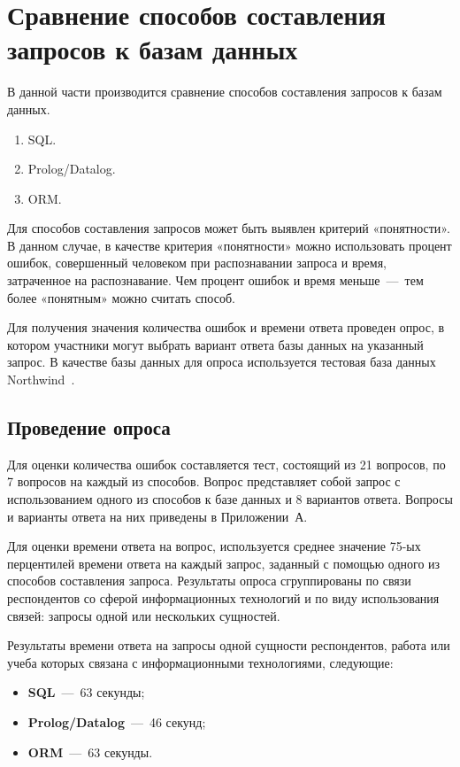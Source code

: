 \chapter{Сравнение способов составления запросов к базам данных}

В данной части производится сравнение способов составления запросов к базам данных.

\begin{enumerate}
	\item SQL.
	\item Prolog/Datalog.
	\item ORM.
\end{enumerate}

Для способов составления запросов может быть выявлен критерий «понятности». В данном случае, в качестве критерия «понятности» можно использовать процент ошибок, совершенный человеком при распознавании запроса и время, затраченное на распознавание. Чем процент ошибок и время меньше~---~тем более «понятным» можно считать способ.

Для получения значения количества ошибок и времени ответа проведен опрос, в котором участники могут выбрать вариант ответа базы данных на указанный запрос. В качестве базы данных для опроса используется тестовая база данных Northwind~\cite{dyer2015adapting}.

\section{Проведение опроса}

Для оценки количества ошибок составляется тест, состоящий из 21 вопросов, по 7 вопросов на каждый из способов. Вопрос представляет собой запрос с использованием одного из способов к базе данных и 8 вариантов ответа. Вопросы и варианты ответа на них приведены в Приложении~А.

Для оценки времени ответа на вопрос, используется среднее значение 75-ых перцентилей времени ответа на каждый запрос, заданный с помощью одного из способов составления запроса. Результаты опроса сгруппированы по связи респондентов со сферой информационных технологий и по виду использования связей: запросы одной или нескольких сущностей.

Результаты времени ответа на запросы одной сущности респондентов, работа или учеба которых связана с информационными технологиями, следующие:

\begin{itemize}
	\item \textbf{SQL}~---~63 секунды;
	\item \textbf{Prolog/Datalog}~---~46 секунд;
	\item \textbf{ORM}~---~63 секунды.
\end{itemize}

